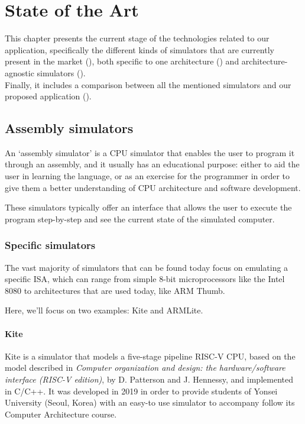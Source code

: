 \chapter{State of the Art}\label{chap:state-of-the-art}
This chapter presents the current stage of the technologies related to our application, specifically the different kinds of simulators that are currently present in the market (), both specific to one architecture () and architecture-agnostic simulators ().\\
Finally, it includes a comparison between all the mentioned simulators and our proposed application ().



\section{Assembly simulators}\label{sec:assembly-simulators}
An `\gls{assembly simulator}' is a CPU simulator that enables the user to program it through an \gls{assembly}, and it usually has an educational purpose: either to aid the user in learning the language, or as an exercise for the programmer in order to give them a better understanding of CPU architecture and software development.

These simulators typically offer an interface that allows the user to execute the program step-by-step and see the current state of the simulated \gls{computer}.


\subsection{Specific simulators}\label{subsec:specific-assembly-simulators}
The vast majority of simulators that can be found today focus on emulating a specific \gls{ISA}, which can range from simple 8-bit microprocessors like the Intel 8080\supercite{i8080emulator} to architectures that are used today, like \gls{ARM} Thumb\supercite{QtARMSim}.

\noindent
Here, we'll focus on two examples: Kite\supercite{song_kite2019} and ARMLite\supercite{ARMLite}.


\subsubsection*{Kite}  %
Kite\supercite{song_kite2019} is a simulator that models a five-stage \gls{pipeline} \gls{RISC-V} CPU, based on the model described in \textit{Computer organization and design: the hardware/software interface (RISC-V edition)}\supercite{PattersonDavidA.2018Coad}, by D. Patterson and J. Hennessy, and implemented in C/C++. It was developed in 2019 in order to provide students of Yonsei University (Seoul, Korea) with an easy-to use simulator to accompany follow its Computer Architecture course.

